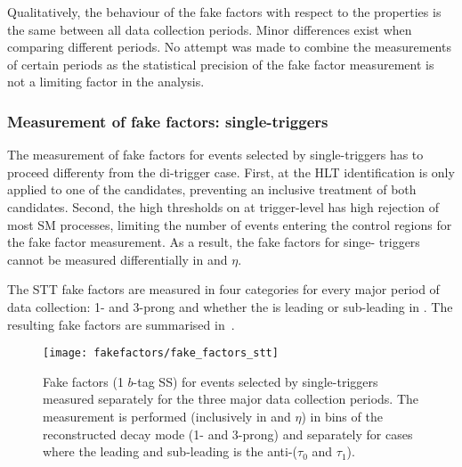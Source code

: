 Qualitatively, the behaviour of the fake factors with respect to the
\tauhadvis properties is the same between all data collection
periods. Minor differences exist when comparing different periods. No
attempt was made to combine the measurements of certain periods as the
statistical precision of the fake factor measurement is not a limiting
factor in the analysis.


\subsubsection{Measurement of fake factors: single-\tauhadvis triggers}

The measurement of fake factors for events selected by
single-\tauhadvis triggers has to proceed differenty from the
di-\tauhadvis trigger case. First, at the HLT \tauhadvis
identification is only applied to one of the \tauhadvis candidates,
preventing an inclusive treatment of both \tauhadvis
candidates. Second, the high \pT thresholds on \tauhadvis at
trigger-level has high rejection of most SM processes, limiting the
number of events entering the control regions for the fake factor
measurement. As a result, the fake factors for singe-\tauhadvis
triggers cannot be measured differentially in \tauhadvis \pT and
$\eta$.

The STT fake factors are measured in four categories for every major
period of data collection: 1- and 3-prong \tauhadvis and whether the
\tauhadvis is leading or sub-leading in \pT. The resulting fake
factors are summarised in~.



\begin{figure}[htbp]
  \centering

  \texttt{[image: fakefactors/fake\_factors\_stt]}

  \caption{Fake factors (1 $b$-tag SS) for events selected by
    single-\tauhadvis triggers measured separately for the three major
    data collection periods. The measurement is performed (inclusively
    in \tauhadvis \pT and $\eta$) in bins of the reconstructed
    \tauhadvis decay mode (1- and 3-prong) and separately for cases
    where the \pT leading and sub-leading \tauhadvis is the
    anti-\tauhadvis ($\tau_0$ and $\tau_1$).}%
  \label{fig:mjfakes_stt_ffs}

\end{figure}


